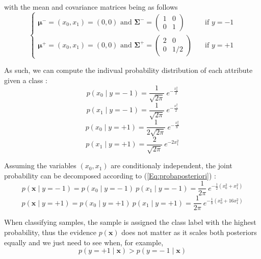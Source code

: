 \documentclass{article}
\begin{document}
with the mean and covariance matrices being as follows
\[   
     \begin{cases}
        \boldsymbol{\mu^-} = (x_0, x_1) = (0,0) \text{ and }
        \boldsymbol{\Sigma^-} =
       \begin{pmatrix} 
            1 & 0 \\
            0 & 1
        \end{pmatrix} 
        &\quad\text{if }  y = - 1\\
        \boldsymbol{\mu^+} = (x_0, x_1) = (0,0) \text{ and }
        \boldsymbol{\Sigma^+} =
       \begin{pmatrix} 
            2 & 0 \\
            0 & 1/2
        \end{pmatrix} 
         &\quad\text{if }  y = + 1
     \end{cases}
\]


As such, we can compute the indivual probability distribution of each attribute given a class :
\begin{equation}
p(x_0 \mid y = -\ 1) = \frac{1}{\sqrt{2\pi}}\ e^{- \frac{x_0^2}{2}}
\end{equation}
\begin{equation}
p(x_1 \mid y = -\ 1) = \frac{1}{\sqrt{2\pi}}\ e^{- \frac{x_1^2}{2}}
\end{equation}
\begin{equation}
p(x_0 \mid y = +1) = \frac{1}{2\sqrt{2\pi}}\ e^{- \frac{x_0^2}{8}}
\end{equation}
\begin{equation}
p(x_1 \mid y = +1)  = \frac{2}{\sqrt{2\pi}}\ e^{-2x_1^2}
\end{equation}

Assuming the variables $(x_0, x_1)$ are conditionaly independent, the joint probability can be decomposed according to (\ref{Eq:probaposteriori}) :
\begin{equation}
    p(\boldsymbol{x} \mid y = -\ 1) = p(x_0 \mid y = -\ 1)\ p(x_1 \mid y = -\ 1) = \frac{1}{2\pi}\ e^{-\frac{1}{2}(x_0^2 + x_1^2)}
\label{Eq:priorminus}
\end{equation}
\begin{equation}
    p(\boldsymbol{x} \mid y = + 1) = p(x_0 \mid y = + 1)\ p(x_1 \mid y = + 1) = \frac{1}{2\pi}\ e^{-\frac{1}{8}(x_0^2 + 16x_1^2)}
\label{Eq:priorplus}
\end{equation}

When classifying samples, the sample is assigned the class label with the highest probability, thus the evidence $p(\boldsymbol{x})$ does not matter as it scales both posteriors equally and we just need to see when, for example, 
\begin{equation}
    p(y = + 1  \mid \boldsymbol{x}) > p(y = -\ 1  \mid \boldsymbol{x})
    \label{Eq:higherposterior}
\end{equation}
\end{document}
